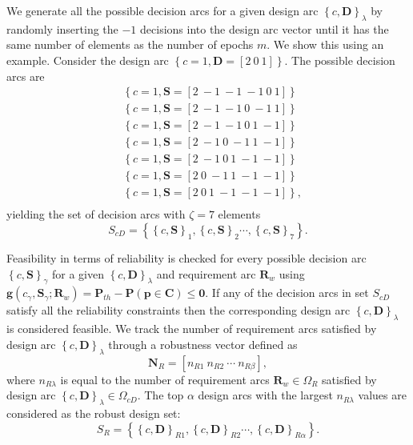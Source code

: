 We generate all the possible decision arcs for a given design arc $\left\{c,\mathbf{D}\right\}_\lambda$ by randomly inserting the $-1$ decisions into the design arc vector until it has the same number of elements as the number of epochs $m$. We show this using an example. Consider the design arc $\left\{c = 1,\mathbf{D} = \left[2 ~ 0 ~ 1\right]\right\}$. The possible decision arcs are
%
\begin{equation*}
	\begin{aligned}
		& \left\{c = 1,\mathbf{S} = \left[2 ~ -1 ~ -1 ~ -1 ~ 0 ~ 1\right]\right\}\\
		& \left\{c = 1,\mathbf{S} = \left[2 ~ -1 ~ -1 ~ 0 ~ -1 ~ 1\right]\right\}\\
		& \left\{c = 1,\mathbf{S} = \left[2 ~ -1 ~ -1 ~ 0 ~ 1 ~ -1\right]\right\}\\
		& \left\{c = 1,\mathbf{S} = \left[2 ~ -1 ~ 0 ~ -1 ~ 1 ~ -1\right]\right\}\\
		& \left\{c = 1,\mathbf{S} = \left[2 ~ -1 ~ 0 ~ 1 ~ -1 ~ -1\right]\right\}\\
		& \left\{c = 1,\mathbf{S} = \left[2 ~ 0 ~ -1 ~ 1 ~ -1 ~ -1\right]\right\}\\
		& \left\{c = 1,\mathbf{S} = \left[2 ~ 0 ~ 1 ~ -1 ~ -1 ~ -1\right]\right\},\\
	\end{aligned}
\end{equation*}
%
yielding the set of decision arcs with $\zeta = 7$ elements
%
\begin{equation} \label{eq:enumeratedcS}
	S_{cD} = \left\{\left\{c,\mathbf{S}\right\}_{1},\left\{c,\mathbf{S}\right\}_{2}\cdots,\left\{c,\mathbf{S}\right\}_{7}\right\}.
\end{equation}

Feasibility in terms of reliability is checked for every possible decision arc $\left\{c,\mathbf{S}\right\}_{\gamma}$ for a given $\left\{c,\mathbf{D}\right\}_\lambda$ and requirement arc $\mathbf{R}_w$ using $\mathbf{g}(c_{\gamma},\mathbf{S}_{\gamma};\mathbf{R}_w) = \mathbf{P}_{th} - \mathbf{P}(\mathbf{p} \in \mathbf{C}) \le \mathbf{0}$. If any of the decision arcs in set $S_{cD}$ satisfy all the reliability constraints then the corresponding design arc $\left\{c,\mathbf{D}\right\}_\lambda$ is considered feasible. We track the number of requirement arcs satisfied by design arc $\left\{c,\mathbf{D}\right\}_\lambda$ through a robustness vector defined as
%
\begin{equation} \label{eq:robustnessvec}
	\mathbf{N}_R = \left[n_{R1} ~ n_{R2} ~ \cdots ~ n_{R\beta}\right], %
\end{equation}
%
where $n_{R\lambda}$ is equal to the number of requirement arcs $\mathbf{R}_w \in \Omega_R$ satisfied by design arc $\left\{c,\mathbf{D}\right\}_\lambda \in \Omega_{cD}$. The top $\alpha$ design arcs with the largest $n_{R\lambda}$ values are considered as the robust design set:
%
\begin{equation} \label{eq:SBDrobust}
	S_R = \left\{\left\{c,\mathbf{D}\right\}_{R1},\left\{c,\mathbf{D}\right\}_{R2}\cdots,\left\{c,\mathbf{D}\right\}_{R\alpha}\right\}.
\end{equation}

